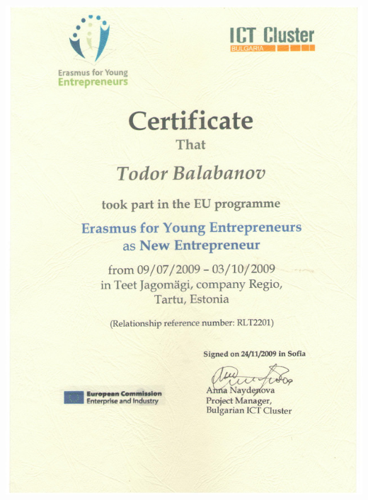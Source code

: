 \documentclass[english,a4paper]{europasscv}
\begin{document}
\includegraphics[width=\textwidth,height=\textheight,keepaspectratio]{EYE2009}
\end{document}
